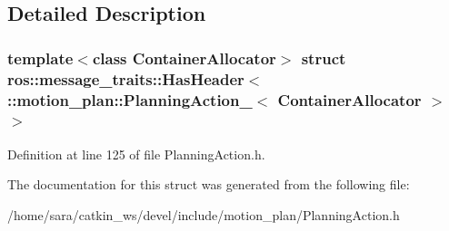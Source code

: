 \subsection{Detailed Description}
\subsubsection*{template$<$class Container\+Allocator$>$\newline
struct ros\+::message\+\_\+traits\+::\+Has\+Header$<$ \+::motion\+\_\+plan\+::\+Planning\+Action\+\_\+$<$ Container\+Allocator $>$ $>$}



Definition at line 125 of file Planning\+Action.\+h.



The documentation for this struct was generated from the following file\+:\begin{DoxyCompactItemize}
\item 
/home/sara/catkin\+\_\+ws/devel/include/motion\+\_\+plan/Planning\+Action.\+h\end{DoxyCompactItemize}
